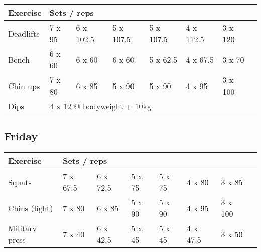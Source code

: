 \documentclass[12pt, a4paper]{article}%
\begin{document}
  \begin{tabular}{l|lllllll}
  \hspace{0.75em} \textbf{Exercise} & \multicolumn{ 7 }{l}{ \textbf{Sets / reps} } \\ \hline

            \hspace{0.75em} Deadlifts
            & 7 x 95
            & 6 x 102.5
            & 5 x 107.5
            & 5 x 107.5
            & 4 x 112.5
            & 3 x 120
            & 
            \\


            \hspace{0.75em} Bench
            & 6 x 60
            & 6 x 60
            & 6 x 60
            & 5 x 62.5
            & 4 x 67.5
            & 3 x 70
            & 
            \\


            \hspace{0.75em} Chin ups
            & 7 x 80
            & 6 x 85
            & 5 x 90
            & 5 x 90
            & 4 x 95
            & 3 x 100
            & 
            \\


   \hspace{0.75em} Dips &  \multicolumn{ 7 }{l}{ 4 x 12 @ bodyweight + 10kg } \\
  \end{tabular}

  \subsection*{\hspace{0.5em} Friday }


  \begin{tabular}{l|lllllll}
  \hspace{0.75em} \textbf{Exercise} & \multicolumn{ 7 }{l}{ \textbf{Sets / reps} } \\ \hline

            \hspace{0.75em} Squats
            & 7 x 67.5
            & 6 x 72.5
            & 5 x 75
            & 5 x 75
            & 4 x 80
            & 3 x 85
            & 
            \\


            \hspace{0.75em} Chins (light)
            & 7 x 80
            & 6 x 85
            & 5 x 90
            & 5 x 90
            & 4 x 95
            & 3 x 100
            & 
            \\


            \hspace{0.75em} Military press
            & 7 x 40
            & 6 x 42.5
            & 5 x 45
            & 5 x 45
            & 4 x 47.5
            & 3 x 50
            & 
            \\


  \end{tabular}
\end{document}
